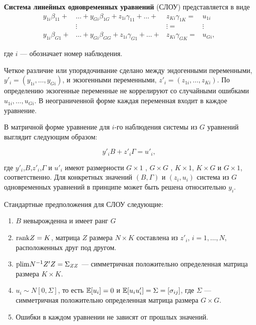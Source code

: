 \textbf{Система линейных одновременных уравнений} (СЛОУ) представляется в виде
\[
\begin{aligned}
y_{1i}\beta_{11}+ &\dots + y_{Gi}\beta_{1G}+z_{1i}\gamma_{11} + \dots + &z_{Ki}\gamma_{1K}=  &u_{1i} \\
                  &\vdots                                               &\vdots           =  &\vdots \\
y_{1i}\beta_{G1}+ &\dots + y_{Gi}\beta_{GG}+z_{1i}\gamma_{G1} + \dots + &z_{Ki}\gamma_{GK}=  &u_{Gi},
\end{aligned}
\]

где $i$ --- обозначает номер наблюдения.

Четкое различие или упорядочивание сделано между эндогенными переменными, $y'_{i}=(y_{1i},\dots,y_{Gi})$, и экзогенными переменными, $z'_{i}=(z_{1i},\dots,z_{Ki})$. По определению экзогенные переменные не коррелируют со случайными ошибками $u_{1i},\dots,u_{Gi}$. В неограниченной форме каждая переменная входит в каждое уравнение. 

В матричной форме уравнение для $i$-го наблюдения системы из $G$ уравнений выглядит следующим образом:

\begin{equation}
y'_{i}B+z'_{i}\Gamma=u'_{i},
\end{equation}

где $y'_{i}$,$B$,$z'_{i}$,$\Gamma$ и $u'_{i}$ имеют размерности $G \times 1$ , $G \times G$ , $ K \times 1$, $K \times G$ и $G \times 1$, соответственно. Для конкретных значений $(B,\Gamma)$ и $(z_i,u_i)$ система из $G$ одновременных уравнений в принципе может быть решена относительно $y_i$.

Стандартные предположения для СЛОУ следующие:

\begin{enumerate}
\item $B$ невырожденна и имеет ранг $G$
\item $\mathrm{rank} Z = K$,   матрица $Z$ размера $N \times K$ составлена из $z'_{i}$, $i=1, \dots, N$, расположенных друг под другом.
\item $\mathrm{plim } N^{-1}Z'Z=\Sigma_{ZZ}$ --- симметричная положительно определенная матрица размера $K \times K$.
\item $u_{i}\sim N[0,\Sigma]$, то есть  $\mathbb{E}[u_{i}]=0$ и $\mathbb{E}[u_{i}u'_{i}]=\Sigma=[\sigma_{ij}]$, где $\Sigma$ --- симметричная положительно определенная матрица размера $G \times G$.
\item Ошибки в каждом уравнении не зависят от прошлых значений.
\end{enumerate}


